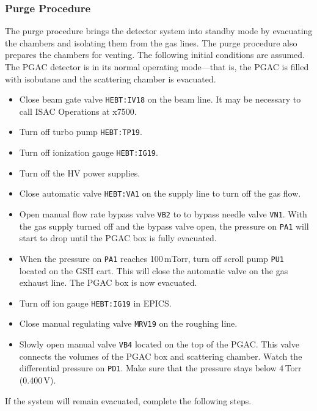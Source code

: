 \subsubsection{Purge Procedure}
The purge procedure brings the detector system into standby mode by evacuating the chambers and isolating them from the gas lines. The purge procedure also prepares the chambers for venting. The following initial conditions are assumed. The PGAC detector is in its normal operating mode---that is, the PGAC is filled with isobutane and the scattering chamber is evacuated. %
\begin{itemize}
\setlength{\itemsep}{0pt}
\setlength{\parskip}{0pt}
\item Close beam gate valve \texttt{HEBT:IV18} on the beam line. It may be necessary to call ISAC Operations at x7500.
\item Turn off turbo pump \texttt{HEBT:TP19}.
\item Turn off ionization gauge \texttt{HEBT:IG19}.
\item Turn off the HV power supplies.
\item Close automatic valve \texttt{HEBT:VA1} on the supply line to turn off the gas flow.
\item Open manual flow rate bypass valve \texttt{VB2} to to bypass needle valve \texttt{VN1}. With the gas supply turned off and the bypass valve open, the pressure on \texttt{PA1} will start to drop until the PGAC box is fully evacuated. 
\item When the pressure on \texttt{PA1} reaches 100\,mTorr, turn off scroll pump \texttt{PU1} located on the GSH cart. This will close the automatic valve on the gas exhaust line. The PGAC box is now evacuated.
\item Turn off ion gauge \texttt{HEBT:IG19} in EPICS.
\item Close manual regulating valve \texttt{MRV19} on the roughing line. 
\item Slowly open manual valve \texttt{VB4} located on the top of the PGAC.  This valve connects the volumes of the PGAC box and scattering chamber. Watch the differential pressure on \texttt{PD1}.  Make sure that the pressure stays below 4\,Torr (0.400\,V).
\end{itemize}
If the system will remain evacuated, complete the following steps.
\begin{itemize}
\setlength{\itemsep}{0pt}
\setlength{\parskip}{0pt}
\turboon
%
\end{itemize}

